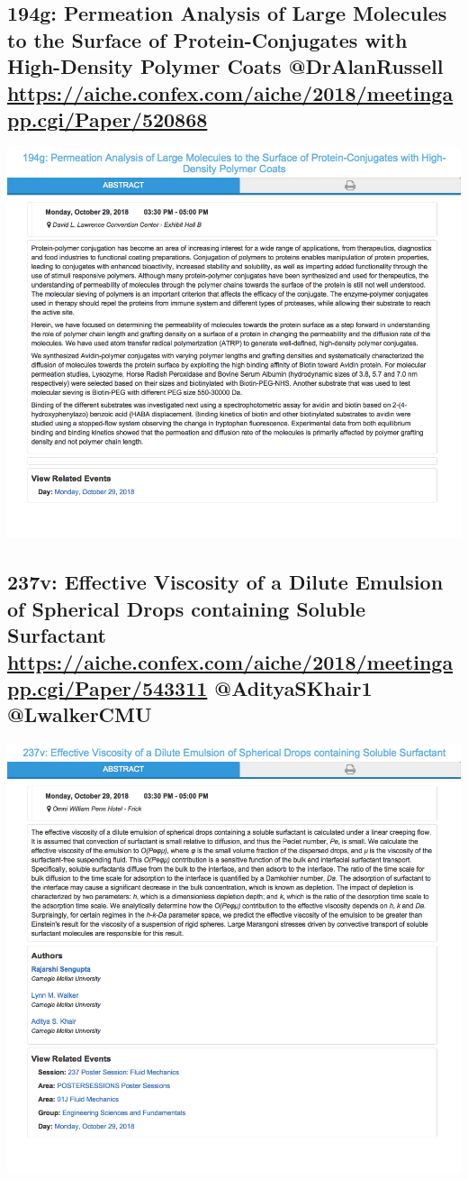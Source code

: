 \documentclass[11pt]{article}
\begin{document}
\subsection{194g: Permeation Analysis of Large Molecules to the Surface of Protein-Conjugates with High-Density Polymer Coats @DrAlanRussell \url{https://aiche.confex.com/aiche/2018/meetingapp.cgi/Paper/520868}}
\label{sec:org15ae473}
\begin{center}
\includegraphics[width=.9\linewidth]{./520868.png}
\end{center}
\subsection{237v: Effective Viscosity of a Dilute Emulsion of Spherical Drops containing Soluble Surfactant \url{https://aiche.confex.com/aiche/2018/meetingapp.cgi/Paper/543311} @AdityaSKhair1 @LwalkerCMU}
\label{sec:org3dcf882}
\begin{center}
\includegraphics[width=.9\linewidth]{./543311.png}
\end{center}
\end{document}
